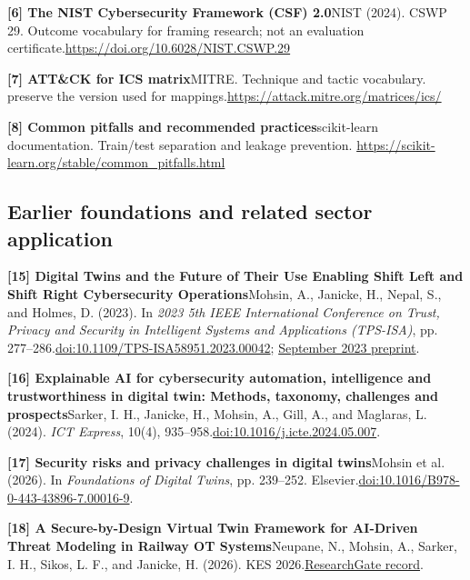 \textbf{[6] The NIST Cybersecurity Framework (CSF) 2.0}\newline NIST (2024). CSWP 29. Outcome vocabulary for framing research; not an evaluation certificate.\newline \href{https://doi.org/10.6028/NIST.CSWP.29}{https://doi.org/10.6028/NIST.CSWP.29}

\textbf{[7] ATT\&CK for ICS matrix}\newline MITRE. Technique and tactic vocabulary.  preserve the version used for mappings.\newline \href{https://attack.mitre.org/matrices/ics/}{https://attack.mitre.org/matrices/ics/}

\textbf{[8] Common pitfalls and recommended practices}\newline scikit-learn documentation. Train/test separation and leakage prevention. \newline \href{https://scikit-learn.org/stable/common_pitfalls.html}{https://scikit-learn.org/stable/common\_pitfalls.html}



\clearpage\subsection*{Earlier foundations and related sector application}
\textbf{[15] Digital Twins and the Future of Their Use Enabling Shift Left and Shift Right Cybersecurity Operations}\newline Mohsin, A., Janicke, H., Nepal, S., and Holmes, D. (2023). In \textit{2023 5th IEEE International Conference on Trust, Privacy and Security in Intelligent Systems and Applications (TPS-ISA)}, pp. 277--286.\newline \href{https://doi.org/10.1109/TPS-ISA58951.2023.00042}{doi:10.1109/TPS-ISA58951.2023.00042}; \href{https://arxiv.org/abs/2309.13612}{September 2023 preprint}.

\textbf{[16] Explainable AI for cybersecurity automation, intelligence and trustworthiness in digital twin: Methods, taxonomy, challenges and prospects}\newline Sarker, I. H., Janicke, H., Mohsin, A., Gill, A., and Maglaras, L. (2024). \textit{ICT Express}, 10(4), 935--958.\newline \href{https://doi.org/10.1016/j.icte.2024.05.007}{doi:10.1016/j.icte.2024.05.007}.

\textbf{[17] Security risks and privacy challenges in digital twins}\newline Mohsin et al. (2026). In \textit{Foundations of Digital Twins}, pp. 239--252. Elsevier.\newline \href{https://doi.org/10.1016/B978-0-443-43896-7.00016-9}{doi:10.1016/B978-0-443-43896-7.00016-9}.

\textbf{[18] A Secure-by-Design Virtual Twin Framework for AI-Driven Threat Modeling in Railway OT Systems}\newline Neupane, N., Mohsin, A., Sarker, I. H., Sikos, L. F., and Janicke, H. (2026). KES 2026.\newline \href{https://www.researchgate.net/publication/414633139_A_Secure-by-Design_Virtual_Twin_Framework_for_AI-Driven_Threat_Modeling_in_Railway_OT_Systems}{ResearchGate record}.
